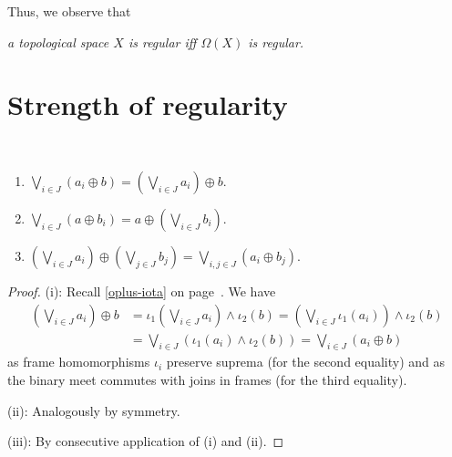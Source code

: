 Thus, we observe that
\begin{center} 
  \emph{a topological space $X$ is regular iff $\Omega(X)$ is regular.\/}
\end{center}

\section{Strength of regularity}

\begin{lem} \label{oplus-vee-distrib}
  ~
  \begin{enumerate}
  \item $\bigvee_{i\in J} \left(a_i \oplus b\right) = \left(\bigvee_{i\in J}
    a_i \right) \oplus b$.
  \item $\bigvee_{i\in J} \left(a \oplus b_i\right) = a \oplus
    \left(\bigvee_{i\in J} b_i \right)$.
  \item $\left(\bigvee_{i\in J} a_i\right) \oplus \left(\bigvee_{j\in J}
    b_j\right) = \bigvee_{i, j\in J} \left(a_i \oplus b_j\right)$.
  \end{enumerate}
\end{lem}
\begin{proof}
  (i):
  Recall \ref{oplus-iota} on page~\pageref{oplus-iota}\thinspace.
  We have
  \begin{align*}
    \left(\bigvee_{i\in J} a_i \right) \oplus b
    &= \iota_1\left(\bigvee_{i\in J} a_i \right) \wedge \iota_2(b)
    = \left(\bigvee_{i\in J} \iota_1(a_i) \right) \wedge \iota_2(b) \\
    &= \bigvee_{i\in J} \left(\iota_1(a_i) \wedge \iota_2(b) \right)
    = \bigvee_{i\in J} \left(a_i \oplus b\right)
  \end{align*}
  as frame homomorphisms $\iota_i$ preserve suprema (for the second equality)
  and as the binary meet commutes with joins in frames (for the third
  equality).

  (ii):
  Analogously by symmetry.

  (iii):
  By consecutive application of (i) and (ii).
\end{proof}

